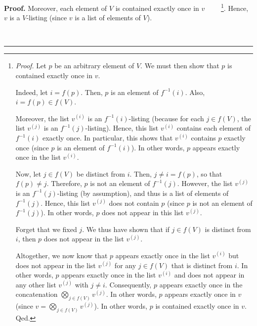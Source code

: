 \documentclass[numbers=enddot,12pt,final,onecolumn,notitlepage]{scrartcl}%
\numberwithin{exer}{section}
\theoremstyle{definition}
\newenvironment{proof}[1][Proof]{\noindent\textbf{#1.} }{\ \rule{0.5em}{0.5em}}
\newenvironment{verlong}{}{}
\begin{document}
\begin{verlong}
\begin{proof}
Moreover, each element of $V$ is contained exactly once in $v$%
\ \ \ \ \footnote{\textit{Proof.} Let $p$ be an arbitrary element of $V$. We
must then show that $p$ is contained exactly once in $v$.
\par
Indeed, let $i=f\left(  p\right)  $. Then, $p$ is an element of $f^{-1}\left(
i\right)  $. Also, $i=f\left(  p\right)  \in f\left(  V\right)  $.
\par
Moreover, the list $v^{\left(  i\right)  }$ is an $f^{-1}\left(  i\right)
$-listing (because for each $j\in f\left(  V\right)  $, the list $v^{\left(
j\right)  }$ is an $f^{-1}\left(  j\right)  $-listing). Hence, this list
$v^{\left(  i\right)  }$ contains each element of $f^{-1}\left(  i\right)  $
exactly once. In particular, this shows that $v^{\left(  i\right)  }$ contains
$p$ exactly once (since $p$ is an element of $f^{-1}\left(  i\right)  $). In
other words, $p$ appears exactly once in the list $v^{\left(  i\right)  }$.
\par
Now, let $j\in f\left(  V\right)  $ be distinct from $i$. Then, $j\neq
i=f\left(  p\right)  $, so that $f\left(  p\right)  \neq j$. Therefore, $p$ is
not an element of $f^{-1}\left(  j\right)  $. However, the list $v^{\left(
j\right)  }$ is an $f^{-1}\left(  j\right)  $-listing (by assumption), and
thus is a list of elements of $f^{-1}\left(  j\right)  $. Hence, this list
$v^{\left(  j\right)  }$ does not contain $p$ (since $p$ is not an element of
$f^{-1}\left(  j\right)  $). In other words, $p$ does not appear in this list
$v^{\left(  j\right)  }$.
\par
Forget that we fixed $j$. We thus have shown that if $j\in f\left(  V\right)
$ is distinct from $i$, then $p$ does not appear in the list $v^{\left(
j\right)  }$.
\par
Altogether, we now know that $p$ appears exactly once in the list $v^{\left(
i\right)  }$ but does not appear in the list $v^{\left(  j\right)  }$ for any
$j\in f\left(  V\right)  $ that is distinct from $i$. In other words, $p$
appears exactly once in the list $v^{\left(  i\right)  }$ and does not appear
in any other list $v^{\left(  j\right)  }$ with $j\neq i$. Consequently, $p$
appears exactly once in the concatenation $\bigotimes\limits_{j\in f\left(
V\right)  }v^{\left(  j\right)  }$. In other words, $p$ appears exactly once
in $v$ (since $v=\bigotimes\limits_{j\in f\left(  V\right)  }v^{\left(
j\right)  }$). In other words, $p$ is contained exactly once in $v$. Qed.}.
Hence, $v$ is a $V$-listing (since $v$ is a list of elements of $V$).


\end{proof}
\end{verlong}
\end{document}
